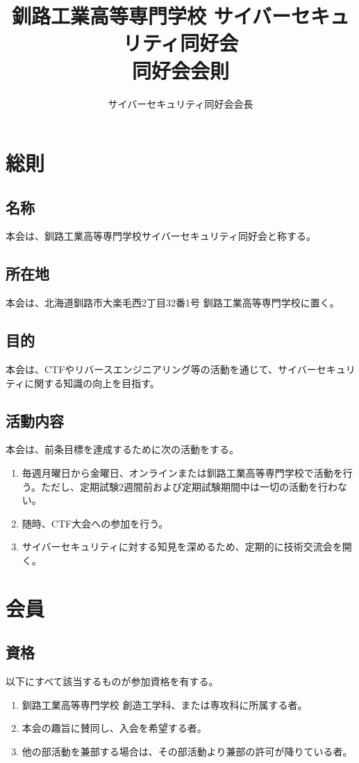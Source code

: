 \documentclass{jsreport}
\title{釧路工業高等専門学校 サイバーセキュリティ同好会\\ \Large 同好会会則}
\author{サイバーセキュリティ同好会会長}
\begin{document}
\maketitle
\tableofcontents

\chapter{総則}
\section{名称}
本会は、釧路工業高等専門学校サイバーセキュリティ同好会と称する。

\section{所在地}
本会は、北海道釧路市大楽毛西2丁目32番1号 釧路工業高等専門学校に置く。

\section{目的}
本会は、CTFやリバースエンジニアリング等の活動を通じて、サイバーセキュリティに関する知識の向上を目指す。

\section{活動内容}\label{sec:about_of_activity}
本会は、前条目標を達成するために次の活動をする。 
\begin{enumerate}
    \item 毎週月曜日から金曜日、オンラインまたは釧路工業高等専門学校で活動を行う。ただし、定期試験2週間前および定期試験期間中は一切の活動を行わない。
    \item 随時、CTF大会への参加を行う。
    \item サイバーセキュリティに対する知見を深めるため、定期的に技術交流会を開く。
\end{enumerate}

\chapter{会員}
\section{資格}
以下にすべて該当するものが参加資格を有する。
\begin{enumerate}
    \item 釧路工業高等専門学校 創造工学科、または専攻科に所属する者。
    \item 本会の趣旨に賛同し、入会を希望する者。
    \item 他の部活動を兼部する場合は、その部活動より兼部の許可が降りている者。
\end{enumerate}
\end{document}
